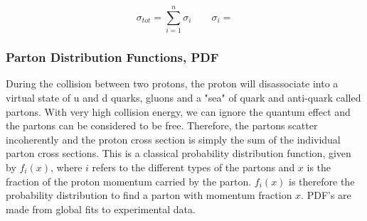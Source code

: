 \begin{equation}
\sigma_{tot}=\sum_{i=1}^n \sigma_{i} \qquad \sigma_{i}=
\end{equation}

\subsubsection{Parton Distribution Functions, PDF}
During the collision between two protons, the proton will disassociate into a virtual state of u and d quarks, gluons and a "sea" of quark and anti-quark called partons. With very high collision energy, we can ignore the quantum effect and the partons can be considered to be free. Therefore, the partons scatter incoherently and the proton cross section is simply the sum of the individual parton cross sections. This is a classical probability distribution function, given by $f_{i}(x)$, where $i$ refers to the different types of the partons and $x$ is the fraction of the proton momentum carried by the parton\cite{green2005hpp}. $f_{i}(x)$ is therefore the probability distribution to find a parton with momentum fraction $x$. PDF's are made from global fits to experimental data.

